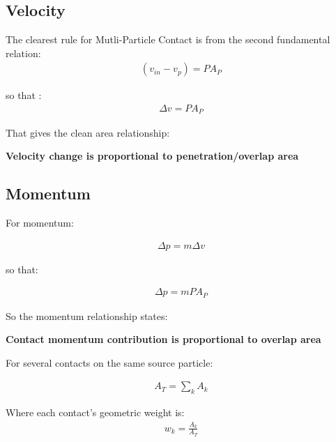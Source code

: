 \subsection{Velocity}

The clearest rule for Mutli-Particle Contact is from the second fundamental relation:
\begin{equation}
\begin{aligned}
(v_{in} - v_p) = P A_P
\end{aligned}
\end{equation}

so that :
\begin{equation}
\begin{aligned}
\Delta v = P A_P
\end{aligned}
\end{equation}

That gives the clean area relationship:

\textbf{Velocity change is proportional to penetration/overlap area}

\subsection{Momentum}

For momentum:

\begin{equation}
\begin{aligned}
\Delta p = m \Delta v
\end{aligned}
\end{equation}

so that:


\begin{equation}
\begin{aligned}
\Delta p = m P A_P
\end{aligned}
\end{equation}

So the momentum relationship states:

\textbf{Contact momentum contribution is proportional to overlap area}

For several contacts on the same source particle:

\begin{equation}
\begin{aligned}
A_T = \sum_k A_k
\end{aligned}
\end{equation}

Where each contact’s geometric weight is:
\begin{equation}
\begin{aligned}
w_k = \frac{A_k}{A_T}
\end{aligned}
\end{equation}

